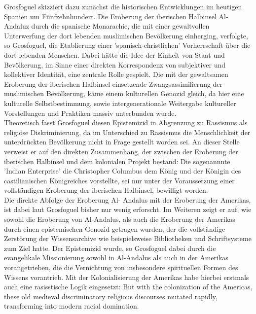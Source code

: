 \noindent Grosfoguel skizziert dazu zunächst die historischen Entwicklungen im heutigen
Spanien um Fünfzehnhundert. Die Eroberung der iberischen Halbinsel Al-Andaluz
durch die spanische Monarachie, die mit einer gewaltvollen Unterwerfung der
dort lebenden muslimischen Bevölkerung einherging, verfolgte, so Grosfoguel,
die Etablierung einer 'spanisch-christlichen' Vorherrschaft über die dort
lebenden Menschen. Dabei hätte die Idee der Einheit von Staat und Bevölkerung,
im Sinne einer direkten Korrespondenz von subjektiver und kollektiver
Identität, eine zentrale Rolle gespielt. \footnotemark
{} Die mit
der gewaltsamen Eroberung der iberischen Halbinsel einsetzende
Zwangsassimilierung der muslimischen Bevölkerung, käme einem kulturellen
Genozid gleich, da hier eine kulturelle Selbstbestimmung, sowie
intergenerationale Weitergabe kultureller Vorstellungen und Praktiken massiv
unterbunden wurde. \footnotemark {}\\

\noindent Theoretisch fasst Grosfoguel diesen Epistemizid in Abgrenzung zu Rassismus als
religiöse Diskriminierung, da im Unterschied zu Rassismus die Menschlichkeit
der unterdrückten Bevölkerung nicht in Frage gestellt worden sei.\footnotemark
{} An dieser Stelle verweist er auf den direkten Zusammenhang, der zwischen der Eroberung
der iberischen Halbinsel und dem kolonialen Projekt bestand: Die sogenannnte
'Indian Enterprise' die Christopher Columbus dem König und der Königin des
castilianischen Königreiches vorstellte, sei nur unter der Voraussetzung einer
vollständigen Eroberung der iberischen Halbinsel, bewilligt worden.\\

\noindent Die direkte Abfolge der Eroberung Al- Andalus mit der Eroberung der Amerikas,
ist dabei laut Grosfoguel bisher nur wenig erforscht.\footnotemark
{} Im Weiteren zeigt er
auf, wie sowohl die Eroberung von Al-Andalus, als auch die Eroberung der
Amerikas durch einen epistemischen Genozid getragen wurden, der die
vollständige Zerstörung der Wissensarchive wie beispielsweise Bibliotheken und
Schriftsysteme zum Ziel hatte.\footnotemark
{}  Der Epistemizid wurde, so Grosfoguel dabei
durch die evangelikale Missionierung sowohl in Al-Andalus als auch in der
Amerikas vorangetrieben, die die Vernichtung von insbesondere spirituellen
Formen des Wissens vorantrieb. Mit der Kolonialisierung der Amerikas habe
hierbei erstmals auch eine rasisstische Logik eingesetzt: \glqq But with the
colonization of the Americas, these old medieval discriminatory religious
discourses mutated rapidly, transforming into modern racial domination. \grqq
\footnotemark {}\\

